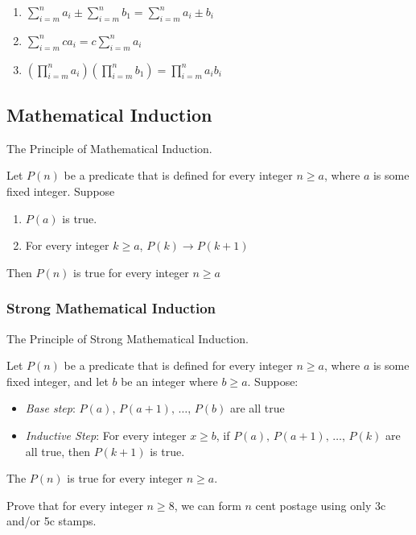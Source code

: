 \begin{enumerate}
    \item $\displaystyle\sum_{i=m}^n a_i \pm \sum_{i=m}^n b_1 = \sum_{i=m}^n a_i \pm b_i$
    \item $\displaystyle\sum_{i=m}^n ca_i = c\sum_{i=m}^n a_i$
    \item $\displaystyle\left(\prod_{i=m}^n a_i\right)\left(\prod_{i=m}^n b_1\right) = \prod_{i=m}^n a_ib_i$
\end{enumerate}

\newpage
\subsection{Mathematical Induction}
\begin{definition}
    The Principle of Mathematical Induction.

    Let $P(n)$ be a predicate that is defined for every integer $n\geq a$, where $a$ is some fixed integer. Suppose \begin{enumerate}
        \item $P(a)$ is true.
        \item For every integer $k\geq a$, $P(k)\rightarrow P(k+1)$
    \end{enumerate}
    Then $P(n)$ is true for every integer $n\geq a$
\end{definition}

\subsubsection{Strong Mathematical Induction}
\begin{definition}
	The Principle of Strong Mathematical Induction.

	Let $P(n)$ be a predicate that is defined for every integer $n\geq a$, where $a$ is some fixed integer, and let $b$ be an integer where $b\geq a$. Suppose:
	\begin{itemize}
		\item \emph{Base step}: $P(a),\,P(a+1),\,\dots,\,P(b)$ are all true
		\item \emph{Inductive Step}: For every integer $x \geq b$, if $P(a), \, P(a + 1),\,\dots,\, P(k)$ are all true, then $P(k+1)$ is true.
	\end{itemize}
	The $P(n)$ is true for every integer $n\geq a$.
\end{definition}


Prove that for every integer $n \geq 8$, we can form $n$ cent postage using only 3c and/or 5c stamps.

